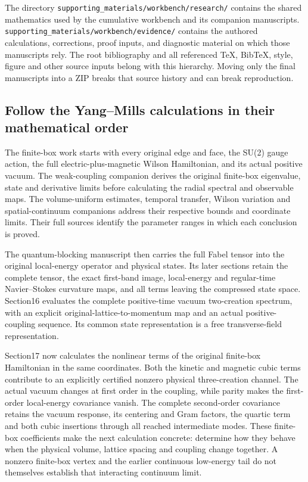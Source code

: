 The directory \texttt{supporting\_materials/workbench/research/}
contains the shared mathematics used by the cumulative workbench and its
companion manuscripts.
\texttt{supporting\_materials/workbench/evidence/} contains the authored
calculations, corrections, proof inputs, and diagnostic material on
which those manuscripts rely. The root bibliography and all referenced
TeX, BibTeX, style, figure and other source inputs belong with this
hierarchy. Moving only the final manuscripts into a ZIP breaks that
source history and can break reproduction.

\subsection{Follow the Yang--Mills calculations in their mathematical
order}\label{full-workbench-reading-map-md-follow-the-yangmills-calculations-in-their-mathematical-order}

The finite-box work starts with every original edge and face, the SU(2)
gauge action, the full electric-plus-magnetic Wilson Hamiltonian, and
its actual positive vacuum. The weak-coupling companion derives the
original finite-box eigenvalue, state and derivative limits before
calculating the radial spectral and observable maps. The volume-uniform
estimates, temporal transfer, Wilson variation and spatial-continuum
companions address their respective bounds and coordinate limits. Their
full sources identify the parameter ranges in which each conclusion is
proved.

The quantum-blocking manuscript then carries the full Fabel tensor into
the original local-energy operator and physical states. Its later
sections retain the complete tensor, the exact first-band image,
local-energy and regular-time Navier--Stokes curvature maps, and all
terms leaving the compressed state space. Section16 evaluates the
complete positive-time vacuum two-creation spectrum, with an explicit
original-lattice-to-momentum map and an actual positive-coupling
sequence. Its common state representation is a free transverse-field
representation.

Section17 now calculates the nonlinear terms of the original finite-box
Hamiltonian in the same coordinates. Both the kinetic and magnetic cubic
terms contribute to an explicitly certified nonzero physical
three-creation channel. The actual vacuum changes at first order in the
coupling, while parity makes the first-order local-energy covariance
vanish. The complete second-order covariance retains the vacuum
response, its centering and Gram factors, the quartic term and both
cubic insertions through all reached intermediate modes. These
finite-box coefficients make the next calculation concrete: determine
how they behave when the physical volume, lattice spacing and coupling
change together. A nonzero finite-box vertex and the earlier continuous
low-energy tail do not themselves establish that interacting continuum
limit.

